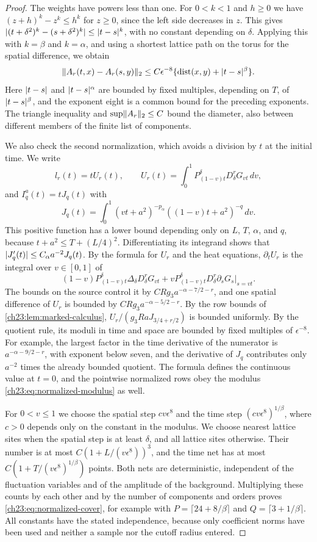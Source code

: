 \begin{proof}
The weights have powers less than one. For $0<k<1$ and $h\ge0$ we have $(z+h)^k-z^k\le h^k$ for $z\ge0$, since the left side decreases in $z$. This gives $\lvert (t+\delta^2)^k-(s+\delta^2)^k\rvert\le\lvert t-s\rvert^k$, with no constant depending on $\delta$. Applying this with $k=\beta$ and $k=\alpha$, and using a shortest lattice path on the torus for the spatial difference, we obtain
\begin{equation}\label{ch23:eq:normalized-modulus}
 \lVert A_r(t,x)-A_r(s,y)\rVert_2\le C\epsilon^{-8}\{\operatorname{dist}(x,y)+\lvert t-s\rvert^\beta\}.
\end{equation}
Here $\lvert t-s\rvert$ and $\lvert t-s\rvert^\alpha$ are bounded by fixed multiples, depending on $T$, of $\lvert t-s\rvert^\beta$, and the exponent eight is a common bound for the preceding exponents. The triangle inequality and $\sup\lVert A_r\rVert_2\le C$ bound the diameter, also between different members of the finite list of components.

We also check the second normalization, which avoids a division by $t$ at the initial time. We write
\[
 l_r(t)=tU_r(t),\qquad U_r(t)=\int_0^1P_{(1-v)t}^\delta D_\delta^rG_{vt}\,dv,
\]
and $I_q^a(t)=tJ_q(t)$ with
\[
 J_q(t)=\int_0^1(vt+a^2)^{-p_\alpha}((1-v)t+a^2)^{-q}\,dv.
\]
This positive function has a lower bound depending only on $L$, $T$, $\alpha$, and $q$, because $t+a^2\le T+(L/4)^2$. Differentiating its integrand shows that $\lvert J_q'(t)\rvert\le C_\alpha a^{-2}J_q(t)$. By the formula for $U_r$ and the heat equations, $\partial_tU_r$ is the integral over $v\in[0,1]$ of
\[
 (1-v)P_{(1-v)t}^\delta\Delta_\delta D_\delta^rG_{vt}+vP_{(1-v)t}^\delta D_\delta^r\partial_sG_s|_{s=vt}.
\]
The bounds on the source control it by $CRg_3a^{-\alpha-7/2-r}$, and one spatial difference of $U_r$ is bounded by $CRg_3a^{-\alpha-5/2-r}$. By the row bounds of \cref{ch23:lem:marked-calculus}, $U_r/(g_3RaJ_{3/4+r/2})$ is bounded uniformly. By the quotient rule, its moduli in time and space are bounded by fixed multiples of $\epsilon^{-8}$. For example, the largest factor in the time derivative of the numerator is $a^{-\alpha-9/2-r}$, with exponent below seven, and the derivative of $J_q$ contributes only $a^{-2}$ times the already bounded quotient. The formula defines the continuous value at $t=0$, and the pointwise normalized rows obey the modulus \eqref{ch23:eq:normalized-modulus} as well.

For $0<v\le1$ we choose the spatial step $cv\epsilon^8$ and the time step $(cv\epsilon^8)^{1/\beta}$, where $c>0$ depends only on the constant in the modulus. We choose nearest lattice sites when the spatial step is at least $\delta$, and all lattice sites otherwise. Their number is at most $C(1+L/(v\epsilon^8))^3$, and the time net has at most $C(1+T/(v\epsilon^8)^{1/\beta})$ points. Both nets are deterministic, independent of the fluctuation variables and of the amplitude of the background. Multiplying these counts by each other and by the number of components and orders proves \eqref{ch23:eq:normalized-cover}, for example with $P=\lceil24+8/\beta\rceil$ and $Q=\lceil3+1/\beta\rceil$. All constants have the stated independence, because only coefficient norms have been used and neither a sample nor the cutoff radius entered.
\end{proof}

